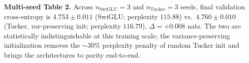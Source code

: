 \textbf{Multi-seed Table 2.} Across $n_{\text{SwiGLU}}{=}3$ and $n_{\text{Tucker}}{=}3$ seeds, final validation cross-entropy is $4.753 \pm 0.011$ (SwiGLU; perplexity $115.88$) vs.\ $4.760 \pm 0.010$ (Tucker, var-preserving init; perplexity $116.79$), $\Delta{=}+0.008$ nats. The two are statistically indistinguishable at this training scale; the variance-preserving initialization removes the $\sim$$30\%$ perplexity penalty of random Tucker init and brings the architectures to parity end-to-end.
